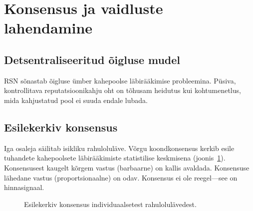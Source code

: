 \documentclass[11pt,a4paper,twocolumn]{article}
\begin{document}
\section{Konsensus ja vaidluste lahendamine}

\subsection{Detsentraliseeritud õigluse mudel}

RSN sõnastab õigluse ümber kahepoolse läbirääkimise probleemina. Püsiva, kontrollitava reputatsioonikahju oht on tõhusam heidutus kui kohtumenetlus, mida kahjustatud pool ei suuda endale lubada.

\subsection{Esilekerkiv konsensus}

Iga osaleja säilitab isikliku rahuloluläve. Võrgu koondkonsensus kerkib esile tuhandete kahepoolsete läbirääkimiste statistilise keskmisena (joonis~\ref{fig:consensus}). Konsensusest kaugelt kõrgem vastus (barbaarne) on kallis avaldada. Konsensuse lähedane vastus (proportsionaalne) on odav. Konsensus ei ole reegel---see on hinnasignaal.

\begin{figure}[ht]
\centering
{}
\caption{Esilekerkiv konsensus individuaalsetest rahulolulävedest.}
\label{fig:consensus}
\end{figure}
\end{document}
